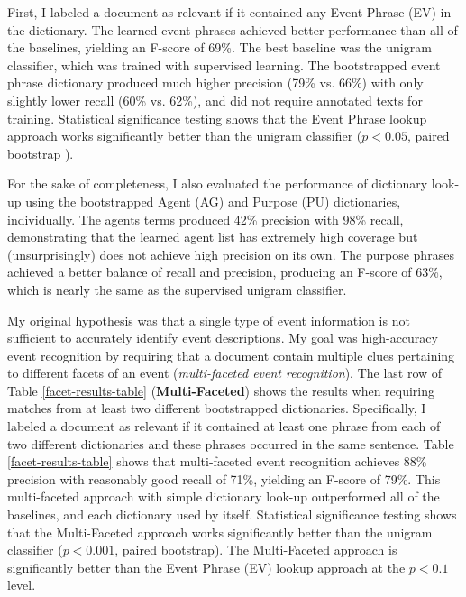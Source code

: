 First, I labeled a
document as relevant if it contained any  Event Phrase (EV) in
the dictionary. The learned event phrases achieved
better performance than all of the baselines, yielding an F-score of
69\%.  The best baseline was the unigram classifier, which was trained
with supervised learning. The
bootstrapped event phrase dictionary produced much higher precision
(79\% vs. 66\%) with only slightly lower recall (60\% vs. 62\%), and
did not require annotated texts for training. Statistical
significance testing  shows that the Event Phrase lookup approach works
significantly better than the unigram classifier ($p < 0.05$, paired
bootstrap \cite{SigTest12}).

For the sake of completeness, I also evaluated the performance of
dictionary look-up using the bootstrapped Agent (AG) and Purpose (PU)
dictionaries, individually. The agents terms produced 42\% precision
with 98\% recall, demonstrating that the learned agent list has
extremely high coverage but (unsurprisingly) does not achieve high
precision on its own.  The purpose phrases achieved a better balance
of recall and precision, producing an F-score of 63\%, which is
nearly the same as the supervised unigram classifier.

My original hypothesis was that a single type of event information is
not sufficient to accurately identify event descriptions.  My goal
was high-accuracy event recognition by requiring that a document
contain multiple clues pertaining to different facets of an event
({\it multi-faceted event recognition}). The last row of Table
\ref{facet-results-table} ({\bf Multi-Faceted}) shows the results when requiring
matches from at least two different bootstrapped
dictionaries. Specifically, I labeled a document as relevant if it
contained at least one phrase from each of two different dictionaries
and these phrases occurred in the same sentence. Table
\ref{facet-results-table} shows that multi-faceted event recognition
achieves 88\% precision with reasonably good recall of 71\%, yielding
an F-score of 79\%. This multi-faceted approach with simple dictionary
look-up outperformed all of the baselines, and each dictionary used by
itself. Statistical significance testing shows that the Multi-Faceted
approach works significantly better than the unigram classifier ($p <
0.001$, paired bootstrap). 
The Multi-Faceted approach is 
significantly 
better than the Event Phrase (EV) lookup approach at the
$p < 0.1$ level. 

